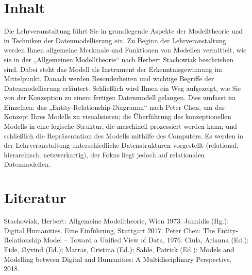 \section{Inhalt}
Die Lehrveranstaltung führt Sie in grundlegende Aspekte der Modelltheorie und in Techniken der Datenmodellierung ein. Zu Beginn der Lehrveranstaltung werden Ihnen allgemeine Merkmale und Funktionen von Modellen vermittelt, wie sie in der „Allgemeinen Modelltheorie“ nach Herbert Stachowiak beschrieben sind. Dabei steht das Modell als Instrument der Erkenntnisgewinnung im Mittelpunkt. Danach werden Besonderheiten und wichtige Begriffe der Datenmodellierung erläutert. Schließlich wird Ihnen ein Weg aufgezeigt, wie Sie von der Konzeption zu einem fertigen Datenmodell gelangen. Dies umfasst im Einzelnen: das „Entity-Relationship-Diagramm“ nach Peter Chen, um das Konzept Ihres Modells zu visualisieren; die Überführung des konzeptionellen Modells in eine logische Struktur, die maschinell prozessiert werden kann; und schließlich die Repräsentation des Modells mithilfe des Computers. Es werden in der Lehrveranstaltung unterschiedliche Datenstrukturen vorgestellt (relational; hierarchisch; netzwerkartig), der Fokus liegt jedoch auf relationalen Datenmodellen.



\section{Literatur}

Stachowiak, Herbert: Allgemeine Modelltheorie, Wien 1973.
Jannidis (Hg.): Digital Humanities. Eine Einführung, Stuttgart 2017.
Peter Chen: The Entity-Relationship Model – Toward a Unified View of Data, 1976.
Ciula, Arianna (Ed.); Eide, Øyvind (Ed.); Marras, Cristina (Ed.); Sahle, Patrick (Ed.): Models and Modelling between Digital and Humanities: A Multidisciplinary Perspective, 2018.
\newpage 

